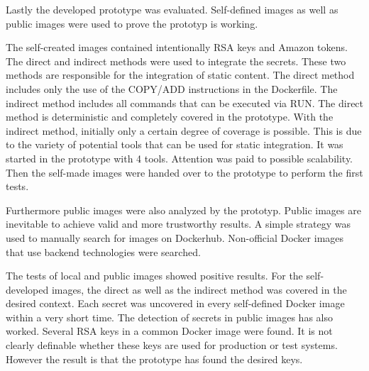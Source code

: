 Lastly the developed prototype was evaluated. 
Self-defined images as well as public images were used to prove the prototyp is working.

The self-created images contained intentionally RSA keys and Amazon tokens.
The direct and indirect methods were used to integrate the secrets.
These two methods are responsible for the integration of static content.
The direct method includes only the use of the COPY/ADD instructions in the Dockerfile.
The indirect method includes all commands that can be executed via RUN.
The direct method is deterministic and completely covered in the prototype.
With the indirect method, initially only a certain degree of coverage is possible.
This is due to the variety of potential tools that can be used for static integration.
It was started in the prototype with 4 tools. Attention was paid to possible scalability.
Then the self-made images were handed over to the prototype to perform the first tests.

Furthermore public images were also analyzed by the prototyp.
Public images are inevitable to achieve valid and more trustworthy results.
A simple strategy was used to manually search for images on Dockerhub.
Non-official Docker images that use backend technologies were searched.

The tests of local and public images showed positive results.
For the self-developed images, the direct as well as the indirect method was covered in the desired context.
Each secret was uncovered in every self-defined Docker image within a very short time.
The detection of secrets in public images has also worked.
Several RSA keys in a common Docker image were found.
It is not clearly definable whether these keys are used for production or test systems.
However the result is that the prototype has found the desired keys.





